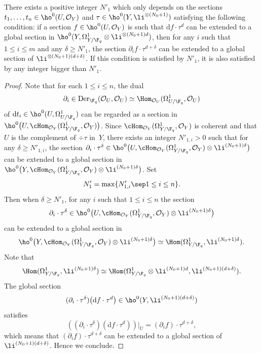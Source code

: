 \begin{lem}\label{beforeextend}
There exists a positive integer $N'_1$ which only depends on the sections $t_1,\dots, t_n\in \ho^0(U, \mathcal{O}_Y)$ and $\tau\in \ho^0(Y, \li^{\otimes (N_0+1)})$ satisfying the following condition: if a section $f \in \ho^0(U, \mathcal{O}_Y)$ is such that $\mathrm{d}f\cdot \tau^{d}$ can be extended to a global section in $\ho^0(Y, \Omega_{Y/\F_q}^1\otimes \li^{\otimes(N_0+1)d})$, then for any $i$ such that $1\leq i\leq m$ and any $\delta \geq N'_1$, the section $\partial_i f \cdot \tau^{d+\delta}$ can be extended to a global section of $\li^{\otimes (N_0+1)(d+\delta)}$. If this condition is satisfied by $N'_1$, it is also satisfied by any integer bigger than $N'_1$.
\end{lem}
\begin{proof}[Proof]
Note that for each $1\leq i\leq n$, the dual
\[
\partial_i\in \mathrm{Der}_{\F_q}(\mathcal{O}_U, \mathcal{O}_U)\simeq \Hom_{\mathcal{O}_U}(\Omega^1_{U/\F_q}, \mathcal{O}_U)
\]
of $\mathrm{d}t_i\in \ho^0(U, \Omega^1_{U/\F_q})$ can be regarded as a section in $\ho^0\bigl(U, \cHom_{\mathcal{O}_Y}(\Omega^1_{Y/\F_q}, \mathcal{O}_Y) \bigr)$. Since $\cHom_{\mathcal{O}_Y}(\Omega^1_{Y/\F_q}, \mathcal{O}_Y)$ is coherent and that $U$ is the complement of $\div \tau$ in~$Y$, there exists an integer $N'_{1,i}>0$ such that for any $\delta\geq N'_{1,i}$, the section $\partial_i\cdot\nobreak \tau^{\delta}\in \ho^0\bigl(U, \cHom_{\mathcal{O}_Y}(\Omega^1_{Y/\F_q}, \mathcal{O}_Y)\otimes \li^{(N_0+1)\delta} \bigr)$ can be extended to a global section in $\ho^0\bigl(Y, \cHom_{\mathcal{O}_Y}(\Omega^1_{Y/\F_q}, \mathcal{O}_Y)\otimes \li^{(N_0+1)\delta} \bigr)$. Set\vspace*{-3pt}
\[
N'_1=\max \{ N'_{1,i}\sep 1\leq i\leq n\}.
\]
Then when $\delta\geq N'_1$, for any $i$ such that $1\leq i\leq n$ the section\vspace*{-3pt}
\[
\partial_i\cdot \tau^{\delta}\in \ho^0\bigl(U, \cHom_{\mathcal{O}_Y}(\Omega^1_{Y/\F_q}, \mathcal{O}_Y)\otimes \li^{(N_0+1)\delta} \bigr)
\]
can be extended to a global section in\vspace*{-3pt}
\[
\ho^0\bigl(Y, \cHom_{\mathcal{O}_Y}(\Omega^1_{Y/\F_q}, \mathcal{O}_Y)\otimes \li^{(N_0+1)\delta} \bigr)\simeq \Hom(\Omega^1_{Y/\F_q}, \li^{(N_0+1)\delta}).
\]
Note that\vspace*{-3pt}
\[
\Hom(\Omega^1_{Y/\F_q}, \li^{(N_0+1)\delta}) \simeq \Hom(\Omega^1_{Y/\F_q}\otimes \li^{(N_0+1)d}, \li^{(N_0+1)(d+\delta)}).
\]
The global section\vspace*{-3pt}
\[
(\partial_i\cdot \tau^{\delta})\big(\mathrm{d}f\cdot \tau^{d} \big)\in \ho^0(Y, \li^{(N_0+1)(d+\delta)})
\]
satisfies\vspace*{-3pt}
\[
\left((\partial_i\cdot \tau^{\delta})(\mathrm{d}f\cdot \tau^{d})\right)\big|_U= \left(\partial_i f \right)\cdot \tau^{d+\delta},
\]
which means that $\left(\partial_i f \right)\cdot \tau^{d+\delta}$ can be extended to a global section of $\li^{(N_0+1)(d+\delta)}$. Hence we conclude.
\end{proof}
